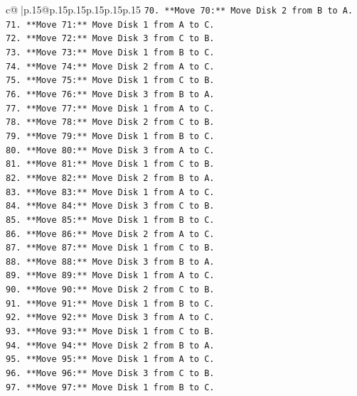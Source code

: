 \documentclass{article}
\begin{document}
{\begin{supertabular}{c@{$\;$}|p{.15\linewidth}@{}p{.15\linewidth}p{.15\linewidth}p{.15\linewidth}p{.15\linewidth}p{.15\linewidth}}
{{{\texttt{70. **Move 70:** Move Disk 2 from B to A.} \\
\texttt{71. **Move 71:** Move Disk 1 from A to C.} \\
\texttt{72. **Move 72:** Move Disk 3 from C to B.} \\
\texttt{73. **Move 73:** Move Disk 1 from B to C.} \\
\texttt{74. **Move 74:** Move Disk 2 from A to C.} \\
\texttt{75. **Move 75:** Move Disk 1 from C to B.} \\
\texttt{76. **Move 76:** Move Disk 3 from B to A.} \\
\texttt{77. **Move 77:** Move Disk 1 from A to C.} \\
\texttt{78. **Move 78:** Move Disk 2 from C to B.} \\
\texttt{79. **Move 79:** Move Disk 1 from B to C.} \\
\texttt{80. **Move 80:** Move Disk 3 from A to C.} \\
\texttt{81. **Move 81:** Move Disk 1 from C to B.} \\
\texttt{82. **Move 82:** Move Disk 2 from B to A.} \\
\texttt{83. **Move 83:** Move Disk 1 from A to C.} \\
\texttt{84. **Move 84:** Move Disk 3 from C to B.} \\
\texttt{85. **Move 85:** Move Disk 1 from B to C.} \\
\texttt{86. **Move 86:** Move Disk 2 from A to C.} \\
\texttt{87. **Move 87:** Move Disk 1 from C to B.} \\
\texttt{88. **Move 88:** Move Disk 3 from B to A.} \\
\texttt{89. **Move 89:** Move Disk 1 from A to C.} \\
\texttt{90. **Move 90:** Move Disk 2 from C to B.} \\
\texttt{91. **Move 91:** Move Disk 1 from B to C.} \\
\texttt{92. **Move 92:** Move Disk 3 from A to C.} \\
\texttt{93. **Move 93:** Move Disk 1 from C to B.} \\
\texttt{94. **Move 94:** Move Disk 2 from B to A.} \\
\texttt{95. **Move 95:** Move Disk 1 from A to C.} \\
\texttt{96. **Move 96:** Move Disk 3 from C to B.} \\
\texttt{97. **Move 97:** Move Disk 1 from B to C.} \\
}}}
\end{supertabular}}
\end{document}

